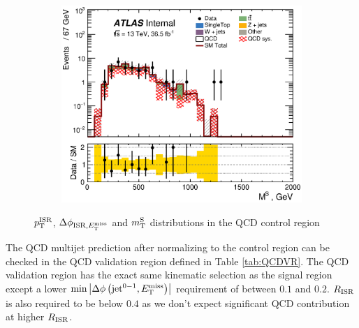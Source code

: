 \begin{figure}[!h]
\begin{center}
\begin{subfigure}[b]{0.40\textwidth}
    \end{subfigure}
        \begin{subfigure}[b]{0.40\textwidth}  
    \includegraphics[width=\textwidth]{figures/QCDJetSmearing/CRQC/MV_36500}
                    \caption{ }
    \end{subfigure}
\caption[~$\PTISR$, $\dphiISRI$ and $\MS$ distributions in the QCD control region]{$\PTISR$, $\dphiISRI$ and $\MS$ distributions in the QCD control region}
\label{fig:QCD:CR}
\end{center}
\end{figure}

\indent The QCD multijet prediction after normalizing to the control region can be checked in the QCD validation region defined in Table \ref{tab:QCDVR}.   The QCD validation region has the exact same kinematic selection as the signal region except a lower $\min \left|\Delta\phi\left(\mathrm{jet}^{0-1},E_{\mathrm{T}}^{\mathrm{miss}}\right)\right|$ requirement of between $0.1$ and $0.2$.  $R_{\mathrm{ISR}}$ is also required to be below $0.4$ as we don't expect significant QCD contribution at higher $R_{\mathrm{ISR}}$.  \\

